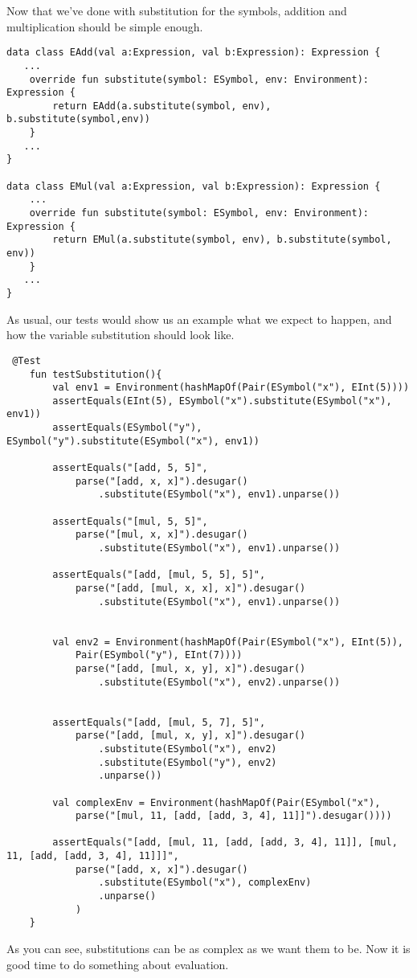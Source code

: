 \documentclass[11pt]{article}
\begin{document}
Now that we've done with substitution for the symbols, addition and multiplication should be simple enough.

\begin{verbatim}
data class EAdd(val a:Expression, val b:Expression): Expression {
   ...
    override fun substitute(symbol: ESymbol, env: Environment): Expression {
        return EAdd(a.substitute(symbol, env), b.substitute(symbol,env))
    }
   ...
}

data class EMul(val a:Expression, val b:Expression): Expression {
    ...
    override fun substitute(symbol: ESymbol, env: Environment): Expression {
        return EMul(a.substitute(symbol, env), b.substitute(symbol, env))
    }
   ...
}

\end{verbatim}

As usual, our tests would show us an example what we expect to happen, and how the variable substitution should look like.

\begin{verbatim}
 @Test
    fun testSubstitution(){
        val env1 = Environment(hashMapOf(Pair(ESymbol("x"), EInt(5))))
        assertEquals(EInt(5), ESymbol("x").substitute(ESymbol("x"), env1))
        assertEquals(ESymbol("y"), ESymbol("y").substitute(ESymbol("x"), env1))

        assertEquals("[add, 5, 5]",
            parse("[add, x, x]").desugar()
                .substitute(ESymbol("x"), env1).unparse())

        assertEquals("[mul, 5, 5]",
            parse("[mul, x, x]").desugar()
                .substitute(ESymbol("x"), env1).unparse())

        assertEquals("[add, [mul, 5, 5], 5]",
            parse("[add, [mul, x, x], x]").desugar()
                .substitute(ESymbol("x"), env1).unparse())


        val env2 = Environment(hashMapOf(Pair(ESymbol("x"), EInt(5)),
            Pair(ESymbol("y"), EInt(7))))
            parse("[add, [mul, x, y], x]").desugar()
                .substitute(ESymbol("x"), env2).unparse())


        assertEquals("[add, [mul, 5, 7], 5]",
            parse("[add, [mul, x, y], x]").desugar()
                .substitute(ESymbol("x"), env2)
                .substitute(ESymbol("y"), env2)
                .unparse())

        val complexEnv = Environment(hashMapOf(Pair(ESymbol("x"),
            parse("[mul, 11, [add, [add, 3, 4], 11]]").desugar())))

        assertEquals("[add, [mul, 11, [add, [add, 3, 4], 11]], [mul, 11, [add, [add, 3, 4], 11]]]",
            parse("[add, x, x]").desugar()
                .substitute(ESymbol("x"), complexEnv)
                .unparse()
            )
    }
\end{verbatim}
As you can see, substitutions can be as complex as we want them to be.
Now it is good time to do something about evaluation.
\end{document}
